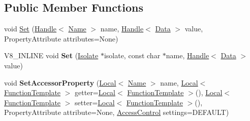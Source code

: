 \subsection*{Public Member Functions}
\begin{DoxyCompactItemize}
\item 
void \hyperlink{classv8_1_1Template_ad464514215a3a6b331c890019124dcbb}{Set} (\hyperlink{classv8_1_1Handle}{Handle}$<$ \hyperlink{classv8_1_1Name}{Name} $>$ name, \hyperlink{classv8_1_1Handle}{Handle}$<$ \hyperlink{classv8_1_1Data}{Data} $>$ value, Property\+Attribute attributes=None)
\item 
\hypertarget{classv8_1_1Template_a92d31ee3f0dc22160bd0964c8aeaeb70}{}V8\+\_\+\+I\+N\+L\+I\+N\+E void {\bfseries Set} (\hyperlink{classv8_1_1Isolate}{Isolate} $\ast$isolate, const char $\ast$name, \hyperlink{classv8_1_1Handle}{Handle}$<$ \hyperlink{classv8_1_1Data}{Data} $>$ value)\label{classv8_1_1Template_a92d31ee3f0dc22160bd0964c8aeaeb70}

\item 
\hypertarget{classv8_1_1Template_a5c702a91581d6cf8cfb72c24ba8b8d17}{}void {\bfseries Set\+Accessor\+Property} (\hyperlink{classv8_1_1Local}{Local}$<$ \hyperlink{classv8_1_1Name}{Name} $>$ name, \hyperlink{classv8_1_1Local}{Local}$<$ \hyperlink{classv8_1_1FunctionTemplate}{Function\+Template} $>$ getter=\hyperlink{classv8_1_1Local}{Local}$<$ \hyperlink{classv8_1_1FunctionTemplate}{Function\+Template} $>$(), \hyperlink{classv8_1_1Local}{Local}$<$ \hyperlink{classv8_1_1FunctionTemplate}{Function\+Template} $>$ setter=\hyperlink{classv8_1_1Local}{Local}$<$ \hyperlink{classv8_1_1FunctionTemplate}{Function\+Template} $>$(), Property\+Attribute attribute=None, \hyperlink{namespacev8_a31d8355cb043d7d2dda3f4a52760b64e}{Access\+Control} settings=D\+E\+F\+A\+U\+L\+T)\label{classv8_1_1Template_a5c702a91581d6cf8cfb72c24ba8b8d17}


\end{DoxyCompactItemize}
